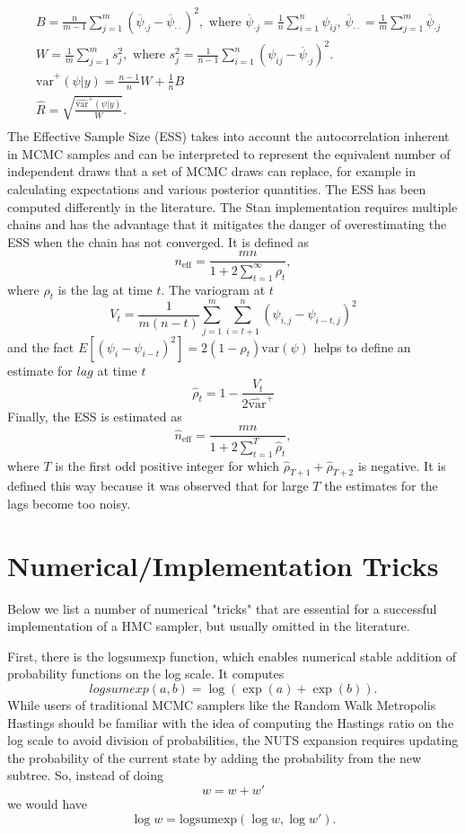 \documentclass[12pt]{report}
\begin{document}
\begin{align*}
&B = \frac{n}{m-1} \sum_{j=1}^{m}(\overline{\psi}_{\cdot j} - \overline{\psi}_{\cdot \cdot})^2, \text{ where } 
\overline{\psi}_{\cdot j} = \frac{1}{n} \sum_{i=1}^n \psi_{ij} ,\, \overline{\psi}_{\cdot \cdot} = \frac{1}{m} \sum_{j=1}^m \overline{\psi}_{\cdot j }
 \\
&W = \frac{1}{m} \sum_{j=1}^m s_j^2 , \text{ where }
s_j^2 = \frac{1}{n-1} \sum_{i=1}^n (\psi_{ij} - \overline{\psi}_{\cdot j } )^2.\\
& \hat{\text{var}}^+(\psi|y) = \frac{n-1}{n} W + \frac{1}{n} B \\
& \hat{R} = \sqrt{\frac{\hat{\text{var}}^+(\psi|y)}{W}}. \\
\end{align*}
The Effective Sample Size (ESS) takes into account the autocorrelation inherent in MCMC samples and can be interpreted to represent the equivalent number of independent draws that a set of MCMC draws can replace, for example in calculating expectations and various posterior quantities. The ESS has been computed  differently in the literature. The Stan implementation requires multiple chains and has the advantage that it mitigates the danger of overestimating the ESS when the chain has not converged. It is defined as 
\[n_{\text{eff}}  = \frac{mn}{1 + 2 \sum_{t=1}^\infty \rho_t}, \]
where  $\rho_t$ is the lag at time $t$. The variogram at $t$ 
\[V_t = \frac{1}{m(n-t)} \sum_{j=1}^m \sum_{i=t+1}^n (\psi_{i,j} - \psi_{i-t,j})^2 \]
and the fact $E[(\psi_i - \psi_{i-t})^2] = 2(1-\rho_t)\text{var}(\psi)$ helps to define an estimate for $lag$ at time $t$ 
\[\hat{\rho}_t = 1 - \frac{V_t}{2 \hat{\text{var}}^+}\]
Finally, the ESS is estimated as 
\[\hat{n}_{\text{eff}} = \frac{mn}{1 + 2 \sum_{t=1}^T \hat{\rho}_t}, \]
where $T$ is the first odd positive integer for which $\hat{\rho}_{T+1} + \hat{\rho}_{T+2} $ is negative. It is defined this way because it was observed that for large $T$ the estimates for the lags become too noisy. 
 
\section{Numerical/Implementation Tricks}

Below we list a number of numerical "tricks" that are essential for a successful implementation of a HMC sampler, but usually omitted in the literature. 

First, there is the logsumexp function, which enables numerical stable addition of probability functions on the log scale. It computes
\[ logsumexp(a,b) = \log(\exp(a) + \exp(b) ). \]
While users of traditional MCMC samplers like the Random Walk Metropolis Hastings should be familiar with the idea of computing the Hastings ratio on the log scale to avoid division of probabilities, the NUTS expansion requires updating the probability of the current state by adding the probability from the new subtree. So, instead of doing 
\[ w = w + w' \] 
we would have
\[ \log w = \text{logsumexp}(\log w, \log w' ). \]
\end{document}
